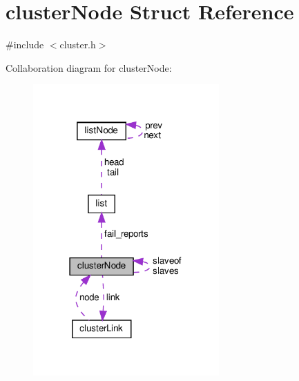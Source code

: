 \hypertarget{structcluster_node}{}\section{cluster\+Node Struct Reference}
\label{structcluster_node}


{\ttfamily \#include $<$cluster.\+h$>$}



Collaboration diagram for cluster\+Node\+:
\nopagebreak
\begin{figure}[H]
\begin{center}
\leavevmode
\includegraphics[width=202pt]{structcluster_node__coll__graph}
\end{center}
\end{figure}

